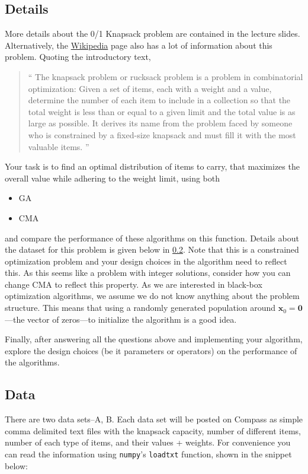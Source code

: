\documentclass[11pt]{article}
\begin{document}
\subsection{Details}
\label{sec:orgac0b7b5}
More details about the 0/1 Knapsack problem are contained in the lecture slides.
Alternatively, the \href{https://en.wikipedia.org/wiki/Knapsack\_problem}{Wikipedia} page also has a lot of information about this
problem. Quoting the introductory text,
\begin{quote}
`` The knapsack problem or rucksack problem is a problem in combinatorial
optimization: Given a set of items, each with a weight and a value, determine
the number of each item to include in a collection so that the total weight is
less than or equal to a given limit and the total value is as large as possible.
It derives its name from the problem faced by someone who is constrained by a
fixed-size knapsack and must fill it with the most valuable items. ''
\end{quote}

Your task is to find an optimal distribution of items to carry, that
maximizes the overall value while adhering to the weight limit, using both
\begin{itemize}
\item GA
\item CMA
\end{itemize}
and compare the performance of these algorithms on this function. Details about
the dataset for this problem is given below in \cref{sec:data}. Note that this is a constrained
optimization problem and your design choices in the
algorithm need to reflect this. As this seems like a problem with integer
solutions, consider how you can change CMA to reflect this property. As we are
interested in black-box optimization algorithms, we assume we do not know
anything about the problem structure. This means that using a randomly generated
population around \(\mathbf{x}_0 =\mathbf{0}\)---the vector of zeros---to
initialize the algorithm is a good idea.

Finally, after answering all the questions above and implementing your
algorithm, explore the design choices (be it parameters or operators) on the
performance of the algorithms.
\subsection{Data}
\label{sec:data}
There are two data sets--A, B. Each data set will be posted on Compass as simple
comma delimited text files with the knapsack capacity, number of different
items, number of each type of items, and their values + weights. For
convenience you can read the information using \texttt{numpy}'s \texttt{loadtxt} function,
shown in the snippet below:
\end{document}
